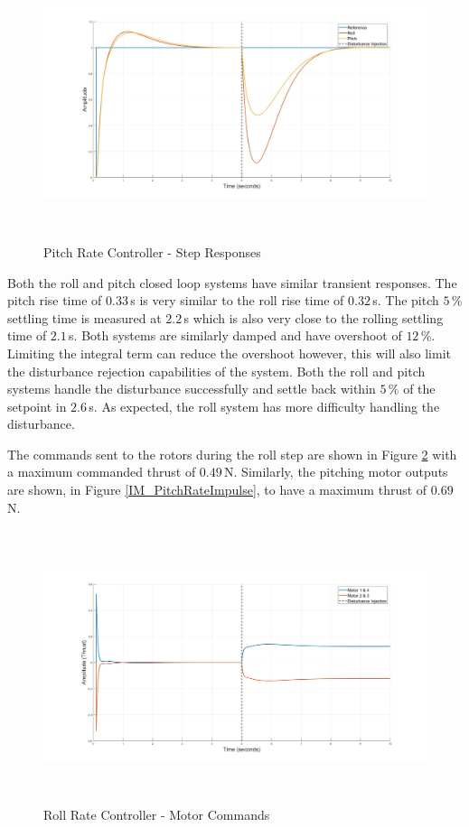 		\begin{figure}[H]
			\centering
			\includegraphics[height = 8cm]{../Design/Matlab/Controllers/roll_pitch_rate_step.jpg}
			\caption{Pitch Rate Controller -  Step Responses}
			\label{IM_PitchRateStep}
		\end{figure}
		
		Both the roll and pitch closed loop systems have similar transient responses. The pitch rise time of $0.33$\,s is very similar to the roll rise time of $0.32$\,s. The pitch $5$\,\% settling time is measured at $2.2$\,s which is also very close to the rolling settling time of $2.1$\,s. Both systems are similarly damped and have overshoot of $12$\,\%. Limiting the integral term can reduce the overshoot however, this will also limit the disturbance rejection capabilities of the system. Both the roll and pitch systems handle the disturbance successfully and settle back within $5$\,\% of the setpoint in $2.6$\,s. As expected, the roll system has more difficulty handling the disturbance.

		The commands sent to the rotors during the roll step are shown in Figure \ref{IM_RollRateImpulse} with a maximum commanded thrust of $0.49$\,N. Similarly, the pitching motor outputs are shown, in Figure \ref{IM_PitchRateImpulse}, to have a maximum thrust of $0.69$\,N.
		
		\begin{figure}[H]
			\centering
			\includegraphics[height = 8cm]{../Design/Matlab/Controllers/roll_rate_impulse.jpg}
			\caption{Roll Rate Controller -  Motor Commands}
			\label{IM_RollRateImpulse}
		\end{figure}
		

